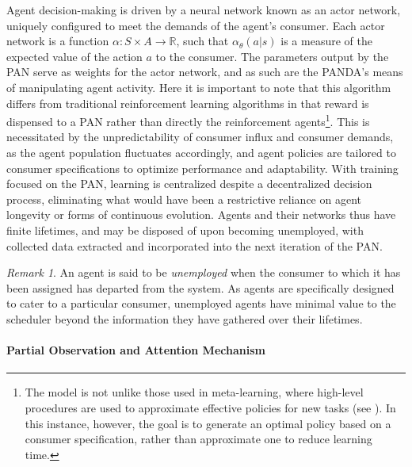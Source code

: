 \documentclass{article}
\theoremstyle{definition}
\theoremstyle{remark}
\newtheorem*{remark}{Remark}
\newcommand{\func}[3]{#1:#2\rightarrow#3}
\begin{document}
			Agent decision-making is driven by a neural network known as an actor network, uniquely configured to meet the demands of the agent's consumer. Each actor network is a function $\func{\alpha}{S \times A}{\mathbb{R}}$, such that $\alpha_\theta(a | s)$ is a measure of the expected value of the action $a$ to the consumer. The parameters output by the PAN serve as weights for the actor network, and as such are the PANDA's means of manipulating agent activity. Here it is important to note that this algorithm differs from traditional reinforcement learning algorithms in that reward is dispensed to a PAN rather than directly the reinforcement agents\footnote{The model is not unlike those used in meta-learning, where high-level procedures are used to approximate effective policies for new tasks (see \cite{al2017continuous, frans2017meta}). In this instance, however, the goal is to generate an optimal policy based on a consumer specification, rather than approximate one to reduce learning time.}. This is necessitated by the unpredictability of consumer influx and consumer demands, as the agent population fluctuates accordingly, and agent policies are tailored to consumer specifications to optimize performance and adaptability. With training focused on the PAN, learning is centralized despite a decentralized decision process, eliminating what would have been a restrictive reliance on agent longevity or forms of continuous evolution. Agents and their networks thus have finite lifetimes, and may be disposed of upon becoming unemployed, with collected data extracted and incorporated into the next iteration of the PAN.

			\begin{remark}
				An agent is said to be \emph{unemployed} when the consumer to which it has been assigned has departed from the system. As agents are specifically designed to cater to a particular consumer, unemployed agents have minimal value to the scheduler beyond the information they have gathered over their lifetimes.
			\end{remark}

			\paragraph{Partial Observation and Attention Mechanism}
			
\end{document}
